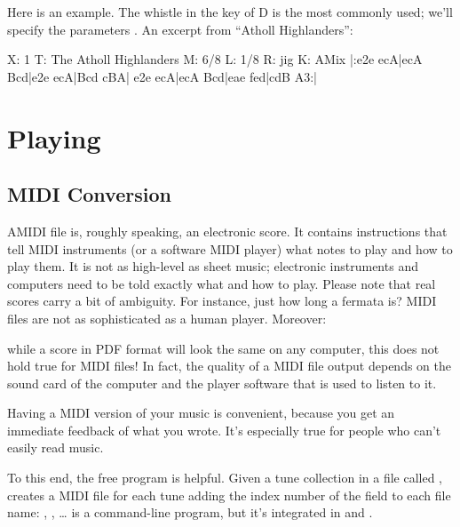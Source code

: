 \documentclass[a4paper,12pt]{book}
\begin{document}
\medskip

Here is an example. The whistle in the key of D is the most commonly
used; we'll specify the parameters . An excerpt
from ``Atholl Highlanders'':

\begin{abcsource}
X: 1
T: The Atholl Highlanders
M: 6/8
L: 1/8
R: jig
K: AMix
%
|:e2e ecA|ecA Bcd|e2e ecA|Bcd cBA|
e2e ecA|ecA Bcd|eae fed|cdB A3:|
\end{abcsource}



\noteseparator


\chapter{Playing}
\label{sec:sound}

\section{MIDI Conversion}
\label{sec:midi}

\lettrine{A}{MIDI} file is, roughly speaking, an electronic score. It
contains instructions that tell MIDI instruments (or a software MIDI
player) what notes to play and how to play them. It is not as
high-level as sheet music; electronic instruments and computers need
to be told exactly what and how to play. Please note that real scores
carry a bit of ambiguity. For instance, just how long a fermata is?
MIDI files are not as sophisticated as a human player. Moreover:

\begin{vimp}

  while a score in PDF format will look the same on any computer, this
  does not hold true for MIDI files! In fact, the quality of a MIDI
  file output depends on the sound card of the computer and the player
  software that is used to listen to it.

\end{vimp}

Having a MIDI version of your \ABC{} music is convenient, because
you get an immediate feedback of what you wrote. It's especially true
for people who can't easily read music.

To this end, the free \abcmid{} program is helpful. Given a tune
collection in a file called , \abcmid{} creates a MIDI
file for each tune adding the index number of the  field to
each file name: , , {\ldots} \abcmid{}
is a command-line program, but it's integrated in \abcexplorer{} and
\jedabc.
\end{document}
